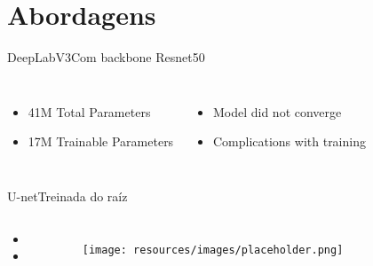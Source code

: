 \section{Abordagens}
\begin{frame}[c]{DeepLabV3}{Com backbone Resnet50}

    \begin{columns}
            \begin{itemize}
                  \item 41M Total Parameters
                  \item 17M Trainable Parameters
            \end{itemize}
            \begin{itemize}
                  \item Model did not converge
                  \item Complications with training
            \end{itemize}
    \end{columns}

    
  \end{frame}



\begin{frame}[c]{U-net}{Treinada do raíz}

        \begin{columns}

            \begin{itemize}
                  \item 
                  \item 
            \end{itemize}

            \begin{figure}[h]
                \centering
                \texttt{[image: resources/images/placeholder.png]}
            \end{figure}

        \end{columns}
    
  \end{frame}

